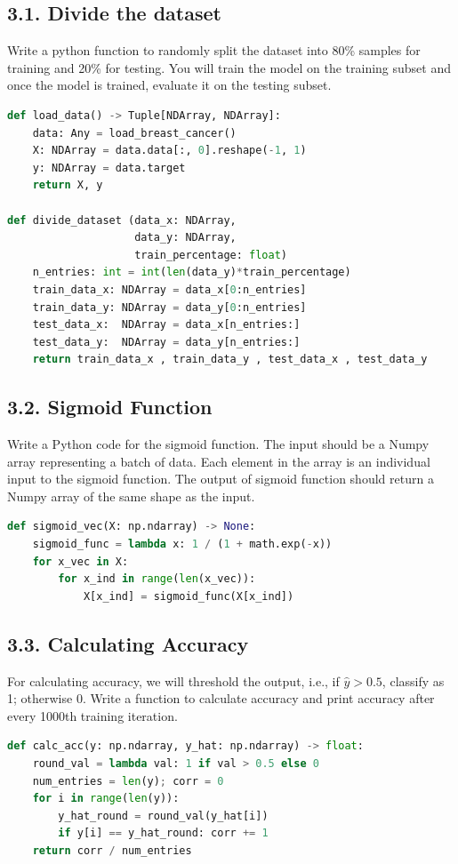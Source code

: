 \documentclass[11pt]{article}
\theoremstyle{plain}
\begin{document}
\subsection*{3.1. Divide the dataset }
Write a python function to randomly split the dataset into 80\% samples for training and 20\% for testing.  You will train the model on the training subset and once the model is trained, evaluate it on the testing subset.
\begin{lstlisting}[language=Python]
def load_data() -> Tuple[NDArray, NDArray]:
    data: Any = load_breast_cancer()
    X: NDArray = data.data[:, 0].reshape(-1, 1)
    y: NDArray = data.target
    return X, y
    
def divide_dataset (data_x: NDArray,
                    data_y: NDArray, 
                    train_percentage: float)
    n_entries: int = int(len(data_y)*train_percentage)
    train_data_x: NDArray = data_x[0:n_entries]  
    train_data_y: NDArray = data_y[0:n_entries]  
    test_data_x:  NDArray = data_x[n_entries:]   
    test_data_y:  NDArray = data_y[n_entries:]  
    return train_data_x , train_data_y , test_data_x , test_data_y
\end{lstlisting}

\subsection*{3.2. Sigmoid Function }
Write a Python code for the sigmoid function.  The input should be a Numpy array representing a batch of data.  Each element in the array is an individual input to the sigmoid function.  The output of sigmoid function should return a Numpy array of the same shape as the input.
\begin{lstlisting}[language=Python]
def sigmoid_vec(X: np.ndarray) -> None:
    sigmoid_func = lambda x: 1 / (1 + math.exp(-x))
    for x_vec in X:
        for x_ind in range(len(x_vec)):
            X[x_ind] = sigmoid_func(X[x_ind])
\end{lstlisting}

\subsection*{3.3. Calculating Accuracy }
For calculating accuracy, we will threshold the output, i.e., if $\hat{y}>0.5$, classify as 1;  otherwise 0. Write a function to calculate accuracy and print accuracy after every 1000th training iteration.
\begin{lstlisting}[language=Python]
def calc_acc(y: np.ndarray, y_hat: np.ndarray) -> float:
    round_val = lambda val: 1 if val > 0.5 else 0
    num_entries = len(y); corr = 0
    for i in range(len(y)):
        y_hat_round = round_val(y_hat[i])
        if y[i] == y_hat_round: corr += 1
    return corr / num_entries
\end{lstlisting}
\end{document}
